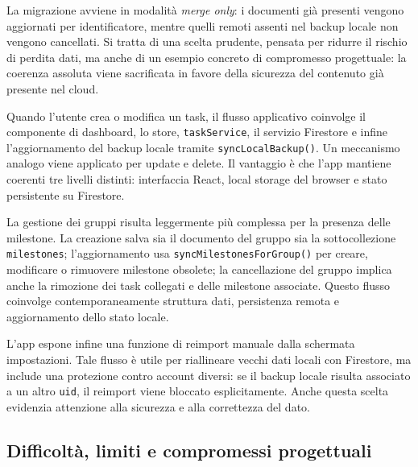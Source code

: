\documentclass[11pt,a4paper]{article}
\begin{document}
\par La migrazione avviene in modalità \emph{merge only}: i documenti già presenti vengono aggiornati per identificatore, mentre quelli remoti assenti nel backup locale non vengono cancellati. Si tratta di una scelta prudente, pensata per ridurre il rischio di perdita dati, ma anche di un esempio concreto di compromesso progettuale: la coerenza assoluta viene sacrificata in favore della sicurezza del contenuto già presente nel cloud.

\par Quando l'utente crea o modifica un task, il flusso applicativo coinvolge il componente di dashboard, lo store, \texttt{taskService}, il servizio Firestore e infine l'aggiornamento del backup locale tramite \texttt{syncLocalBackup()}. Un meccanismo analogo viene applicato per update e delete. Il vantaggio è che l'app mantiene coerenti tre livelli distinti: interfaccia React, local storage del browser e stato persistente su Firestore.

\par La gestione dei gruppi risulta leggermente più complessa per la presenza delle milestone. La creazione salva sia il documento del gruppo sia la sottocollezione \texttt{milestones}; l'aggiornamento usa \texttt{syncMilestonesForGroup()} per creare, modificare o rimuovere milestone obsolete; la cancellazione del gruppo implica anche la rimozione dei task collegati e delle milestone associate. Questo flusso coinvolge contemporaneamente struttura dati, persistenza remota e aggiornamento dello stato locale.

\par L'app espone infine una funzione di reimport manuale dalla schermata impostazioni. Tale flusso è utile per riallineare vecchi dati locali con Firestore, ma include una protezione contro account diversi: se il backup locale risulta associato a un altro \texttt{uid}, il reimport viene bloccato esplicitamente. Anche questa scelta evidenzia attenzione alla sicurezza e alla correttezza del dato.
\newpage

\subsection{Difficoltà, limiti e compromessi progettuali}
\end{document}
